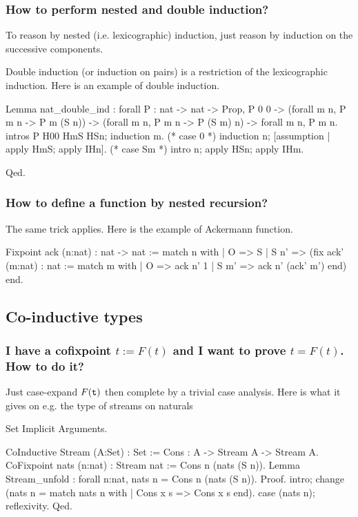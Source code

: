 \documentclass[a4paper,pdftex]{article}
\def\Question#1{\stepcounter{question}\subsubsection{#1}}
\begin{document}
\Question{How to perform nested and double induction?}

 To reason by nested (i.e. lexicographic) induction, just reason by
induction on the successive components.

\smallskip

Double induction (or induction on pairs) is a restriction of the
lexicographic induction. Here is an example of double induction.

\begin{coq_example}
Lemma nat_double_ind : 
forall P : nat -> nat -> Prop, P 0 0 -> 
  (forall m n, P m n -> P m (S n)) -> 
  (forall m n, P m n -> P (S m) n) -> 
     forall m n, P m n.
intros P H00 HmS HSn; induction m.
(* case 0 *)
induction n; [assumption | apply HmS; apply IHn].
(* case Sm *)
intro n; apply HSn; apply IHm.
\end{coq_example}
\begin{coq_eval}
Qed.
\end{coq_eval}

\Question{How to define a function by nested recursion?}

 The same trick applies. Here is the example of Ackermann
function.

\begin{coq_example}
Fixpoint ack (n:nat) : nat -> nat :=
  match n with
  | O => S
  | S n' =>
     (fix ack' (m:nat) : nat :=
        match m with
        | O => ack n' 1
        | S m' => ack n' (ack' m')
        end)
  end.
\end{coq_example}


\subsection{Co-inductive types}

\Question{I have a cofixpoint $t:=F(t)$ and I want to prove $t=F(t)$. How to do it?}

Just case-expand $F({\tt t})$ then complete by a trivial case analysis.
Here is what it gives on e.g. the type of streams on naturals

\begin{coq_eval}
Set Implicit Arguments.
\end{coq_eval}
\begin{coq_example}
CoInductive Stream (A:Set) : Set :=
  Cons : A -> Stream A -> Stream A.
CoFixpoint nats (n:nat) : Stream nat := Cons n (nats (S n)).
Lemma Stream_unfold : 
   forall n:nat, nats n = Cons n (nats (S n)).
Proof.
  intro;
  change (nats n = match nats n with
                  | Cons x s => Cons x s
                  end).
  case (nats n); reflexivity.
Qed.
\end{coq_example}
\end{document}
